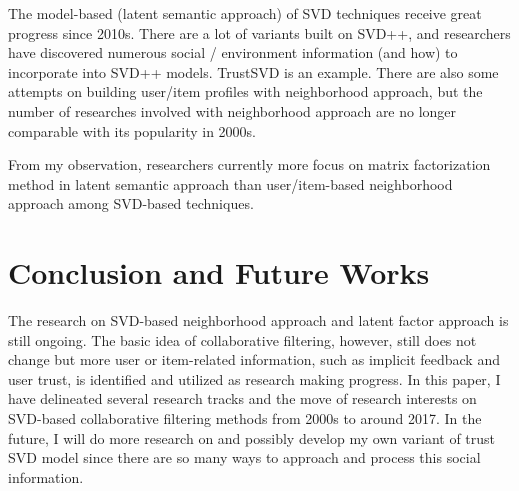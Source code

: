 \documentclass[letter paper, 11pt]{article}
\begin{document}
	
	The model-based (latent semantic approach) of SVD techniques receive great progress since 2010s. There are a lot of variants built on SVD++, and researchers have discovered numerous social / environment information (and how) to incorporate into SVD++ models. TrustSVD is an example. There are also some attempts on building user/item profiles with neighborhood approach, but the number of researches involved with neighborhood approach are no longer comparable with its popularity in 2000s.
	
	
	From my observation, researchers currently more focus on matrix factorization method in latent semantic approach than user/item-based neighborhood approach among SVD-based techniques.
	
	\section{Conclusion and Future Works}

	The research on SVD-based neighborhood approach and latent factor approach is still ongoing. The basic idea of collaborative filtering, however, still does not change but more user or item-related information, such as implicit feedback and user trust, is identified and utilized as research making progress. In this paper, I have delineated several research tracks and the move of research interests on SVD-based collaborative filtering methods from 2000s to around 2017. In the future, I will do more research on and possibly develop my own variant of trust SVD model since there are so many ways to approach and process this social information. 

	
	
\end{document}
